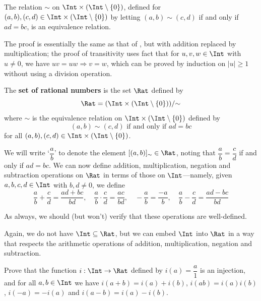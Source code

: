 \begin{lemma}
\label{lemEquivalenceRelationToConstructQFromZ}
The relation $\sim$ on $\Int \times (\Int \setminus \{ 0 \})$, defined for $(a,b), (c,d) \in \Int \times (\Int \setminus \{ 0 \})$ by letting $(a,b) \sim (c,d)$ if and only if $ad=bc$, is an equivalence relation.
\end{lemma}

\begin{sketch}
The proof is essentially the same as that of , but with addition replaced by multiplication; the proof of transitivity uses fact that for $u,v,w \in \Int$ with $u \ne 0$, we have $uv=uw \Rightarrow v=w$, which can be proved by induction on $|u| \ge 1$ without using a division operation.
\end{sketch}

\begin{construction}
\label{cnsRationalsFromIntegers}
The \textbf{set of rational numbers} is the set $\Rat$ defined by
\[ \Rat = (\Int \times (\Int \setminus \{ 0 \})) / {\sim} \]
where $\sim$ is the equivalence relation on $\Int \times (\Int \setminus \{0\})$ defined by
\[ (a,b) \sim (c,d) \text{ if and only if } ad=bc \]
for all $(a,b),(c,d) \in \Int \times (\Int \setminus \{ 0 \})$.
\end{construction}

We will write `$\dfrac{a}{b}$' to denote the element $[(a,b)]_{\sim} \in \Rat$, noting that $\dfrac{a}{b} = \dfrac{c}{d}$ if and only if $ad=bc$. We can now define addition, multiplication, negation and subtraction operations on $\Rat$ in terms of those on $\Int$---namely, given $a,b,c,d \in \Int$ with $b,d \ne 0$, we define
\[ \dfrac{a}{b} + \dfrac{c}{d} = \dfrac{ad+bc}{bd}, \quad \dfrac{a}{b} \cdot \dfrac{c}{d} = \dfrac{ac}{bd}, \quad -\dfrac{a}{b} = \dfrac{-a}{b}, \quad \dfrac{a}{b} - \dfrac{c}{d} = \dfrac{ad-bc}{bd} \]

As always, we should (but won't) verify that these operations are well-defined.

Again, we do not have $\Int \subseteq \Rat$, but we can embed $\Int$ into $\Rat$ in a way that respects the arithmetic operations of addition, multiplication, negation and subtraction.

\begin{exercise}
Prove that the function $i : \Int \to \Rat$ defined by $i(a) = \dfrac{a}{1}$ is an injection, and for all $a,b \in \Int$ we have $i(a+b) = i(a)+i(b)$, $i(ab) = i(a)i(b)$, $i(-a) = -i(a)$ and $i(a-b) = i(a)-i(b)$.
\end{exercise}


